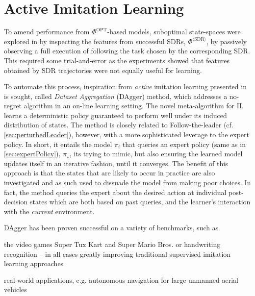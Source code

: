 \documentclass[smallextended]{svjour3}
\begin{document}
	
	\section{Active Imitation Learning}\label{sec:il:active}
	
	To amend performance from $\Phi^{\text{OPT}}$-based models, suboptimal 
	state-spaces were explored in \cite{InRu15a} by inspecting the features from 
	successful SDRs, $\Phi^{\langle\text{SDR}\rangle}$, by passively observing a 
	full execution of following the task chosen by the corresponding SDR. 
	This required some trial-and-error as the experiments showed that features 
	obtained by SDR trajectories were not equally useful for learning.
	
	To automate this process, inspiration from \emph{active} imitation learning 
	presented in \cite{RossGB11} is sought, called \emph{Dataset Aggregation} 
	(DAgger) method, which addresses a no-regret algorithm in an on-line learning 
	setting. 
	The novel meta-algorithm for IL learns a deterministic policy guaranteed to 
	perform well under its induced distribution of states. 
	The method is closely related to Follow-the-leader (cf. 
	\cref{sec:perturbedLeader}), however, with a more sophisticated leverage to the 
	expert policy. 
	In short, it entails the model $\pi_i$ that queries an expert policy (same as 
	in \cref{sec:expertPolicy}), $\pi_\star$, its trying to mimic, 
	but also ensuring the learned model updates itself in an iterative fashion, 
	until it converges. 
	The benefit of this approach is that the states that are likely to occur in 
	practice are also investigated and as such used to dissuade the model from 
	making poor choices. In fact, the method queries the expert about the desired 
	action at individual post-decision states which are both based on past queries, 
	and the learner's interaction with the \emph{current} environment.
	
	DAgger has been proven successful on a variety of benchmarks, such as
	\begin{enumerate*}[label={{}}]
		\item the video games Super Tux Kart and Super Mario Bros. or
		handwriting recognition -- in all cases greatly improving traditional 
		supervised imitation learning approaches \cite{RossGB11}
		\item real-world applications, e.g. autonomous navigation for large unmanned 
		aerial vehicles \cite{Ross13}
	\end{enumerate*}
	
\end{document}
